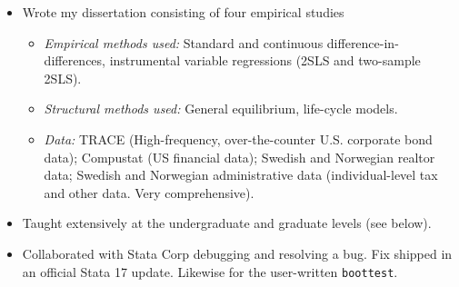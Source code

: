 \documentclass{clean_CV}
\begin{document}
\begin{itemize}
    \item Wrote my dissertation consisting of four empirical studies
    \begin{itemize}
        \item \textit{Empirical methods used:} Standard and continuous difference-in-differences, instrumental variable regressions (2SLS and two-sample 2SLS).
        \item \textit{Structural methods used:} General equilibrium, life-cycle models.
        \item \textit{Data:} TRACE (High-frequency, over-the-counter U.S. corporate bond data); Compustat (US financial data); Swedish and Norwegian realtor data; Swedish and Norwegian administrative data (individual-level tax and other data. Very comprehensive).
    \end{itemize}
    \item Taught extensively at the undergraduate and graduate levels (see below).
    \item Collaborated with Stata Corp debugging and resolving a bug. Fix shipped in an official Stata 17 update. Likewise for the user-written \texttt{boottest}.
\end{itemize}


\iffalse
\medskip

\position{Thomas J. Sargent Dissertation Fellow at the Federal Reserve Bank of San Francisco}{2023}


\begin{itemize}
    \item Received fellowship and access to the bank's researchers to continue research on my dissertation.
    \item Presented solo-authored work twice to the research department and discussed research with Fed and guest researchers.
\end{itemize}
\fi

\medskip

\end{document}
